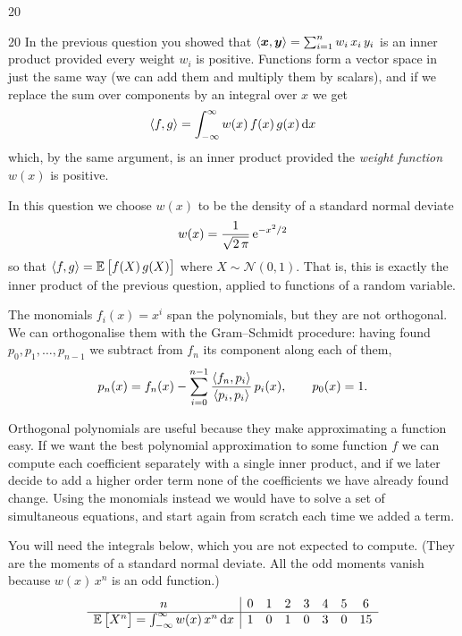 \documentclass{sotonExamBoxes}    %
\begin{document}
\begin{question}{20}
\end{question}




\freshpage



\begin{question}{20}
  In the previous question you showed that $\left\langle \bm{x}, \bm{y}\right\rangle =
  \sum_{i=1}^n w_i\, x_i\, y_i$ is an inner product provided every
  weight $w_i$ is positive.  Functions form a vector space in just the
  same way (we can add them and multiply them by scalars), and if we
  replace the sum over components by an integral over $x$ we get
  \begin{align*}
    \left\langle f, g\right\rangle = \int_{-\infty}^{\infty} w(x)\, f(x)\, g(x)\, \mathrm{d} x
  \end{align*}
  which, by the same argument, is an inner product provided the
  \emph{weight function} $w(x)$ is positive.

  In this question we choose $w(x)$ to be the density of a standard
  normal deviate
  \begin{align*}
    w(x) = \frac{1}{\sqrt{2\,\pi}}\, {\rm e}^{-x^2/2}
  \end{align*}
  so that $\left\langle f, g\right\rangle = \mathbb{E}_{\,}\!\left[ {\strut f(X)\, g(X)} \right]$ where $X\sim
  \mathcal{N}(0,1)$.  That is, this is exactly the inner product of
  the previous question, applied to functions of a random variable.

  The monomials $f_i(x) = x^i$ span the polynomials, but they are not
  orthogonal.  We can orthogonalise them with the Gram--Schmidt
  procedure: having found $p_0, p_1, \ldots, p_{n-1}$ we subtract from
  $f_n$ its component along each of them,
  \begin{align*}
    p_n(x) = f_n(x) - \sum_{i=0}^{n-1}
    \frac{\left\langle f_n, p_i\right\rangle}{\left\langle p_i, p_i\right\rangle}\, p_i(x) ,
    \qquad p_0(x) = 1 .
  \end{align*}

  Orthogonal polynomials are useful because they make approximating a
  function easy.  If we want the best polynomial approximation to some
  function $f$ we can compute each coefficient separately with a
  single inner product, and if we later decide to add a higher order
  term none of the coefficients we have already found change.  Using
  the monomials instead we would have to solve a set of simultaneous
  equations, and start again from scratch each time we added a term.

  You will need the integrals below, which you are not expected to
  compute.  (They are the moments of a standard normal deviate.  All
  the odd moments vanish because $w(x)\,x^n$ is an odd function.)
  \begin{align*}
    \begin{array}{c|ccccccc}
      n & 0 & 1 & 2 & 3 & 4 & 5 & 6 \\ \hline
      \mathbb{E}_{\,}\!\left[ {\strut X^n} \right] = \int_{-\infty}^{\infty} w(x)\, x^n\, \mathrm{d} x
        & 1 & 0 & 1 & 0 & 3 & 0 & 15
    \end{array}
  \end{align*}


\end{question}
\end{document}
